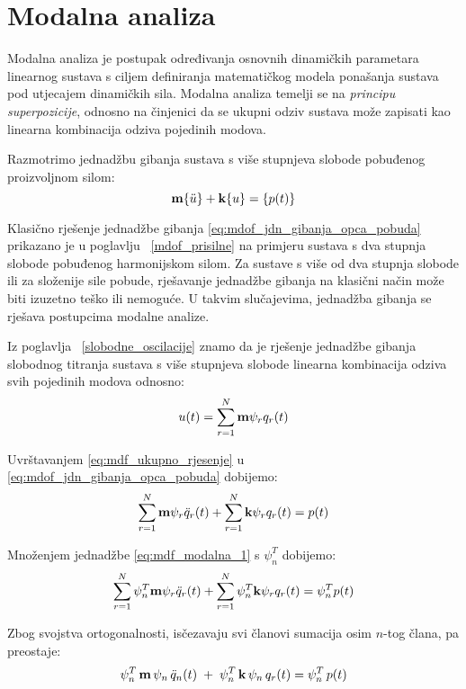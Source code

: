 \section{Modalna analiza}
Modalna analiza je postupak određivanja osnovnih dinamičkih parametara linearnog
sustava s ciljem definiranja matematičkog modela ponašanja sustava pod utjecajem
dinamičkih sila. Modalna analiza temelji se na \textit{principu superpozicije},
odnosno na činjenici da se ukupni odziv sustava može zapisati kao linearna
kombinacija odziva pojedinih modova.
\par

Razmotrimo jednadžbu gibanja sustava s više stupnjeva slobode pobuđenog proizvoljnom
silom:
\begin{equation}\label{eq:mdof_jdn_gibanja_opca_pobuda}
    \mm\vtor{u}{:} + \kk\vtor{u}{} = \vtor{p(t)}{}
\end{equation}

Klasično rješenje jednadžbe gibanja \eqref{eq:mdof_jdn_gibanja_opca_pobuda}
prikazano je u poglavlju ~\ref{mdof_prisilne} na primjeru sustava s dva stupnja 
slobode pobuđenog harmonijskom silom. Za sustave s više od dva stupnja slobode ili
za složenije sile pobude, rješavanje jednadžbe gibanja na klasični način može biti
izuzetno teško ili nemoguće. U takvim slučajevima, jednadžba gibanja se rješava
postupcima modalne analize.
\par

Iz poglavlja ~\ref{slobodne_oscilacije} znamo da je rješenje jednadžbe gibanja
slobodnog titranja sustava s više stupnjeva slobode linearna kombinacija
odziva svih pojedinih modova odnosno:
\begin{equation}\label{eq:mdf_ukupno_rjesenje}
    u(t)=\sum_{r=1}^N\mathbf{m}\psi_rq_r(t)
\end{equation}

Uvrštavanjem \eqref{eq:mdf_ukupno_rjesenje} u \eqref{eq:mdof_jdn_gibanja_opca_pobuda} 
dobijemo:
\begin{equation}\label{eq:mdf_modalna_1}
    \sum_{r=1}^N\mathbf{m}\psi_r\ddot{q}_r(t) + \sum_{r=1}^N\mathbf{k}\psi_rq_r(t)=p(t)
\end{equation}

Množenjem jednadžbe \eqref{eq:mdf_modalna_1} s $\psi_n^T$ dobijemo:
\begin{equation}\label{eq:mdf_modalna_2}
    \sum_{r=1}^N\psi_n^T\mathbf{m}\psi_r\ddot{q}_r(t)+\sum_{r=1}^N\psi_n^T\mathbf{k}\psi_rq_r(t)=\psi_n^Tp(t)
\end{equation}

Zbog svojstva ortogonalnosti, isčezavaju svi članovi sumacija osim $n$-tog člana, pa
preostaje:
\begin{equation}\label{eq:mdf_modalna_jednadzba_nesredjeno}
    \psi_n^T\,\mathbf{m}\,\psi_n\,\ddot{q}_n(t)\;+\;\psi_n^T\,\mathbf{k}\,\psi_n\,q_r(t)=\psi_n^T\,p(t)
\end{equation}

